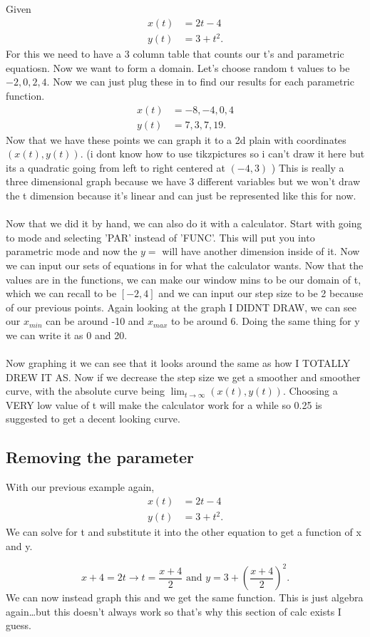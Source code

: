 { Given 
\begin{align*}
	x\left( t \right) &= 2t -4 \\
	y\left( t \right) &=3+t^2
.\end{align*}
For this we need to have a 3 column table that counts our t's and parametric equatiosn. Now we want to form a domain. Let's choose random t values to be $ -2,0,2,4 $. Now we can just plug these in to find our results for each parametric function. 
\begin{align*}
	x\left( t \right) &= -8,-4,0,4 \\
	y\left( t \right) &= 7,3,7,19 
.\end{align*}
Now that we have these points we can graph it to a 2d plain with coordinates $ \left( x\left( t \right) , y\left( t \right)  \right)  $. (i dont know how to use tikzpictures so i can't draw it here but its a quadratic going from left to right centered at $ \left( -4,3 \right)  $ ) This is really a three dimensional graph because we have 3 different variables but we won't draw the t dimension because it's linear and can just be represented like this for now. \\ \\
} 
\newpage
Now that we did it by hand, we can also do it with a calculator. Start with going to mode and selecting 'PAR' instead of 'FUNC'. This will put you into parametric mode and now the $ y= $ will have another dimension inside of it. Now we can input our sets of equations in for what the calculator wants. Now that the values are in the functions, we can make our window mins to be our domain of t, which we can recall to be $ \left[ -2,4 \right]  $ and we can input our step size to be 2 because of our previous points. Again looking at the graph I DIDNT DRAW, we can see our $ x_{ min } $ can be around -10 and $ x_{ max } $ to be around 6. Doing the same thing for y we can write it as $ 0 $ and 20. \\ \\

Now graphing it we can see that it looks around the same as how I TOTALLY DREW IT AS. Now if we decrease the step size we get a smoother and smoother curve, with the absolute curve being $ \lim_{ t \to \infty} \left( x\left( t \right) , y\left( t \right)  \right)  $. Choosing a VERY low value of t will make the calculator work for a while so 0.25 is suggested to get a decent looking curve. 
\subsection{Removing the parameter}%
\label{sub:Removing the parameter}
With our previous example again, 
\begin{align*}
	x\left( t \right) &= 2t -4 \\
	y\left( t \right) &=3+t^2
.\end{align*}
We can solve for t and substitute it into the other equation to get a function of x and y.

\[
	x+4=2t \to t=\frac{ x+4 }{ 2 } \text{ and } y=3+\left( \frac{ x+4 }{ 2 } \right) ^2
.\] 
We can now instead graph this and we get the same function. This is just algebra again\ldots but this doesn't always work so that's why this section of calc exists I guess.
